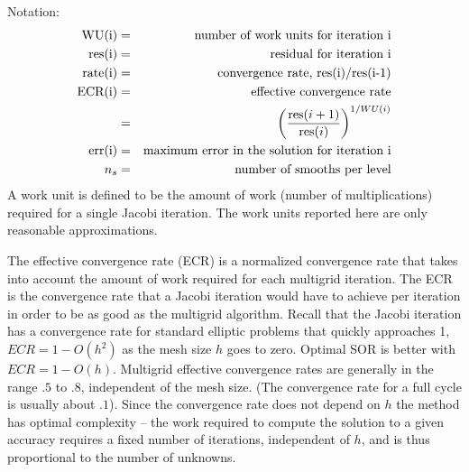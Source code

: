 \def\res {{\rm res}}
\noindent Notation:
\begin{eqnarray*}
 \mbox{WU(i)} &=& \mbox{number of work units for iteration i} \\
 \mbox{res(i)} &=& \mbox{residual for iteration i} \\
 \mbox{rate(i)} &=& \mbox{convergence rate, res(i)/res(i-1)} \\
 \mbox{ECR(i)} &=& \mbox{effective convergence rate} \\
            &=& \left({\res(i+1)\over \res(i)}\right)^{1/WU(i)} \\
 \mbox{err(i)} &=& \mbox{maximum error in the solution for iteration i} \\
 \mbox{$n_s$} &=& \mbox{number of smooths per level}
\end{eqnarray*}
A work unit is defined to be the amount of work
(number of multiplications) required for a single 
Jacobi iteration. The work units reported
here are only reasonable approximations. 

The effective convergence rate (ECR) is a normalized convergence rate
that takes into account the amount of work required for each multigrid
iteration. The ECR is the convergence rate that a Jacobi iteration
would have to achieve per iteration in order to be as good as the
multigrid algorithm. Recall that the Jacobi iteration has a
convergence rate for standard elliptic problems that quickly
approaches 1, $ECR= 1-O(h^2)$ as the mesh size $h$ goes to zero.
Optimal SOR is better with $ECR= 1-O(h)$. Multigrid effective convergence rates
are generally in the range $.5$ to $.8$, independent of the mesh
size. (The convergence rate for a full cycle is usually about $.1$).
Since the convergence rate does not depend on $h$ the method has
optimal complexity -- the work required to compute the solution to a given
accuracy requires a fixed number of iterations, independent of $h$, and
is thus proportional to the number of unknowns.

